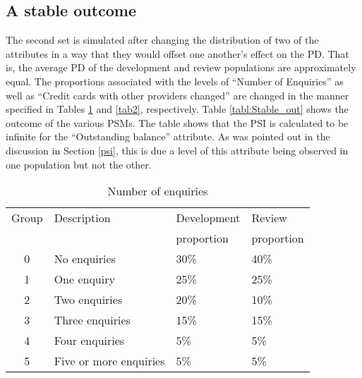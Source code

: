 \documentclass{article}
\theoremstyle{def}
\begin{document}

\subsection{A stable outcome}

The second set is simulated after changing the distribution of two of the attributes in a way that they would offset one another's effect on the PD. That is, the average PD of the development and review populations are approximately equal. The proportions associated with the levels of ``Number of Enquiries'' as well as ``Credit cards with other providers changed'' are changed in the manner specified in Tables \ref{tab1} and \ref{tab2}, respectively. Table \ref{tabl:Stable_out} shows the outcome of the various PSMs. The table shows that the PSI is calculated to be infinite for the ``Outstanding balance'' attribute. As was pointed out in the discussion in Section \ref{psi}, this is due a level of this attribute being observed in one population but not the other.


\begin{table}[H]%
\caption{Number of enquiries}
\label{tab1}
\centering
\small
\begin{tabular}{clll}
\hline
Group & Description & Development & Review \\
 &  & proportion & proportion \\
\hline
0 & No enquiries & 30\%  & 40\% \\
1 & One enquiry & 25\%  & 25\% \\
2 & Two enquiries & 20\% & 10\% \\
3 & Three enquiries & 15\% & 15\% \\
4 & Four enquiries & 5\% & 5\% \\
5 & Five or more enquiries & 5\% & 5\% \\
\hline
\end{tabular}
\end{table}
\end{document}
